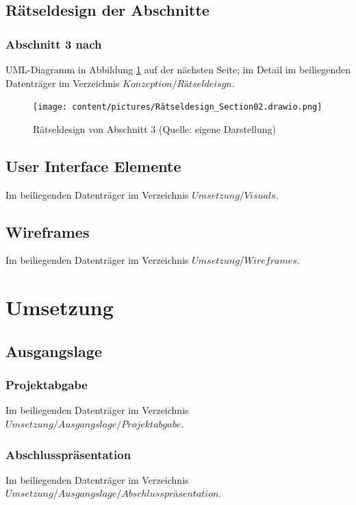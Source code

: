 \documentclass[
	12pt,
	a4paper,
	bibtotoc,
	cleardoubleempty, 
	idxtotoc,
	ngerman,
	openright
	final,
	listof=nochaptergap,
	]{scrbook}
\begin{document}
\begin{appendices}
\subsection{Rätseldesign der Abschnitte}

\subsubsection{Abschnitt 3 nach \cite{schafer_grim_1996}}\label{sec:append_riddles_part_3}
UML-Diagramm in Abbildung \ref{fig:riddle-design-section02-uml} auf der nächsten Seite; im Detail im beiliegenden Datenträger im Verzeichnis $Konzeption/Rätseldeisgn$.

\begin{figure}[ht]
\centering
\texttt{[image: content/pictures/Rätseldesign\_Section02.drawio.png]}
\caption{Rätseldesign von Abschnitt 3 (Quelle: eigene Darstellung)}
\label{fig:riddle-design-section02-uml}
\end{figure}

\clearpage

\subsection{User Interface Elemente}
Im beiliegenden Datenträger im Verzeichnis $Umsetzung/Visuals$.

\subsection{Wireframes}
Im beiliegenden Datenträger im Verzeichnis $Umsetzung/Wireframes$.


\section{Umsetzung}

\subsection{Ausgangslage}

\subsubsection{Projektabgabe}
Im beiliegenden Datenträger im Verzeichnis  $Umsetzung/Ausgangslage/Projektabgabe$.

\subsubsection{Abschlusspräsentation}\label{sec:append_realisation_ausgangslage_presentation}
Im beiliegenden Datenträger im Verzeichnis $Umsetzung/Ausgangslage/Abschlusspräsentation$.


\end{appendices}
\end{document}
